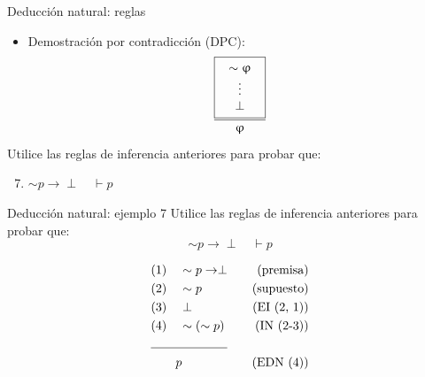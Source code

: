 \documentclass{beamer}
\begin{document}
\begin{frame}{Deducción natural: reglas}
  \begin{itemize}
    \item Demostración por contradicción (DPC):
          \begin{equation*}
            \frac{
              \fbox{
                $\begin{array}{c}
                  \sim \upvarphi \\
                  \vdots \\
                  \perp
                \end{array}$
              }
            }{\upvarphi}
          \end{equation*}
  \end{itemize}

  Utilice las reglas de inferencia anteriores para probar que:
  \begin{enumerate}
    \setcounter{enumi}{6}
    \item $\sim p \rightarrow \perp \quad \vdash p$
  \end{enumerate}
\end{frame}


\begin{frame}{Deducción natural: ejemplo 7}
  Utilice las reglas de inferencia anteriores para probar que:
  $$\sim p \rightarrow \perp \quad \vdash p$$

  \begin{align*}
    &(1) \quad \sim p \rightarrow \perp  & \quad (\text{premisa}) \\
    &(2) \quad \sim p  & \quad (\text{supuesto}) \\
    &(3) \quad \perp  & \quad (\text{EI (2, 1)}) \\
    &(4) \quad \sim (\sim p)  & \quad (\text{IN (2-3)}) \\
    \cline{1-2}
    & \qquad p & \quad (\text{EDN (4)})
  \end{align*}

\end{frame}
\end{document}
